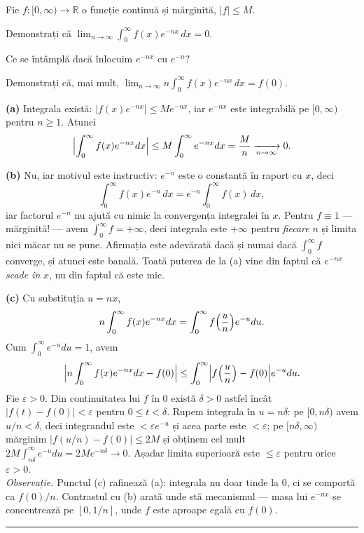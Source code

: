 Fie $f:[0,\infty)\to\mathbb{R}$ o funcție continuă și mărginită, $|f|\le M$.
\begin{parti}
  \item Demonstrați că $\displaystyle\lim_{n\to\infty}\int_0^{\infty}f(x)e^{-nx}\,dx=0$.
  \item Ce se întâmplă dacă înlocuim $e^{-nx}$ cu $e^{-n}$?
  \item Demonstrați că, mai mult,
        $\displaystyle\lim_{n\to\infty}n\int_0^{\infty}f(x)e^{-nx}\,dx=f(0)$.
\end{parti}
\sol\noindent\textbf{(a)} Integrala există: $|f(x)e^{-nx}|\le Me^{-nx}$, iar
$e^{-nx}$ este integrabilă pe $[0,\infty)$ pentru $n\ge1$. Atunci
\[ \Bigl|\int_0^{\infty}f(x)e^{-nx}dx\Bigr|\le M\int_0^{\infty}e^{-nx}dx=\frac{M}{n}
   \xrightarrow[n\to\infty]{}0 . \]

\noindent\textbf{(b)} Nu, iar motivul este instructiv: $e^{-n}$ este o constantă
în raport cu $x$, deci
\[ \int_0^{\infty}f(x)e^{-n}\,dx=e^{-n}\int_0^{\infty}f(x)\,dx, \]
iar factorul $e^{-n}$ nu ajută cu nimic la convergența integralei în $x$. Pentru
$f\equiv1$ --- mărginită! --- avem $\int_0^{\infty}f=+\infty$, deci integrala este
$+\infty$ pentru \emph{fiecare} $n$ și limita nici măcar nu se pune. Afirmația
este adevărată dacă și numai dacă $\int_0^{\infty}f$ converge, și atunci este
banală. Toată puterea de la (a) vine din faptul că $e^{-nx}$ \emph{scade în} $x$,
nu din faptul că este mic.

\noindent\textbf{(c)} Cu substituția $u=nx$,
\[ n\int_0^{\infty}f(x)e^{-nx}dx=\int_0^{\infty}f\Bigl(\frac{u}{n}\Bigr)e^{-u}du . \]
Cum $\int_0^{\infty}e^{-u}du=1$, avem
\[ \Bigl|n\int_0^{\infty}f(x)e^{-nx}dx-f(0)\Bigr|
   \le\int_0^{\infty}\Bigl|f\Bigl(\frac un\Bigr)-f(0)\Bigr|e^{-u}du . \]
Fie $\varepsilon>0$. Din continuitatea lui $f$ în $0$ există $\delta>0$ astfel
încât $|f(t)-f(0)|<\varepsilon$ pentru $0\le t<\delta$. Rupem integrala în
$u=n\delta$: pe $[0,n\delta)$ avem $u/n<\delta$, deci integrandul este
$<\varepsilon e^{-u}$ și acea parte este $<\varepsilon$; pe $[n\delta,\infty)$
mărginim $|f(u/n)-f(0)|\le2M$ și obținem cel mult
$2M\int_{n\delta}^{\infty}e^{-u}du=2Me^{-n\delta}\to0$. Așadar limita superioară
este $\le\varepsilon$ pentru orice $\varepsilon>0$.\\[2pt]
\emph{Observație.} Punctul (c) rafinează (a): integrala nu doar tinde la $0$, ci se
comportă ca $f(0)/n$. Contrastul cu (b) arată unde stă mecanismul --- masa lui
$e^{-nx}$ se concentrează pe $[0,1/n]$, unde $f$ este aproape egală cu $f(0)$.
\vspace{1mm}\hrule

